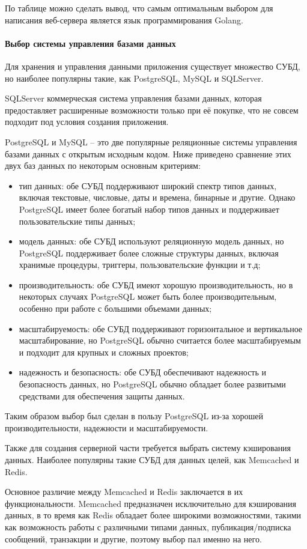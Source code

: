 По таблице можно сделать вывод, что самым оптимальным выбором для
написания веб-сервера является язык программирования Golang.

\paragraph{Выбор системы управления базами данных}

Для хранения и управления данными приложения существует множество СУБД,
но наиболее популярны такие, как PostgreSQL, MySQL и SQLServer.

SQLServer коммерческая система управления базами данных, которая предоставляет
расширенные возможности только при её покупке, что не совсем подходит под
условия создания приложения.

PostgreSQL и MySQL – это две популярные реляционные системы управления базами данных с
открытым исходным кодом. Ниже приведено сравнение этих двух баз данных
по некоторым основным критериям:
\begin{itemize}
	\item тип данных: обе СУБД поддерживают широкий спектр
	      типов данных, включая текстовые, числовые, даты и времена, бинарные и
	      другие. Однако PostgreSQL имеет более богатый набор типов данных и
	      поддерживает пользовательские типы данных;

	\item модель данных: обе СУБД используют реляционную
	      модель данных, но PostgreSQL поддерживает более сложные структуры
	      данных, включая хранимые процедуры, триггеры, пользовательские функции
	      и т.д;

	\item производительность: обе СУБД имеют хорошую
	      производительность, но в некоторых случаях PostgreSQL может быть более
	      производительным, особенно при работе с большими объемами данных;

	\item масштабируемость: обе СУБД поддерживают
	      горизонтальное и вертикальное масштабирование, но PostgreSQL обычно
	      считается более масштабируемым и подходит для крупных и сложных
	      проектов;

	\item надежность и безопасность: обе СУБД обеспечивают
	      надежность и безопасность данных, но PostgreSQL обычно обладает более
	      развитыми средствами для обеспечения защиты данных.
\end{itemize}

Таким образом выбор был сделан в пользу PostgreSQL из-за хорошей
производительности, надежности и масштабируемости.

Также для создания серверной части требуется выбрать систему
кэширования данных. Наиболее популярны такие СУБД для данных
целей, как Memcached и Redis.

Основное различие между Memcached и Redis заключается в их
функциональности. Memcached предназначен исключительно для
кэширования данных, в то время как Redis обладает более широкими
возможностями, такими как возможность работы с различными типами
данных, публикация/подписка сообщений, транзакции и другие, поэтому
выбор пал именно на него.

